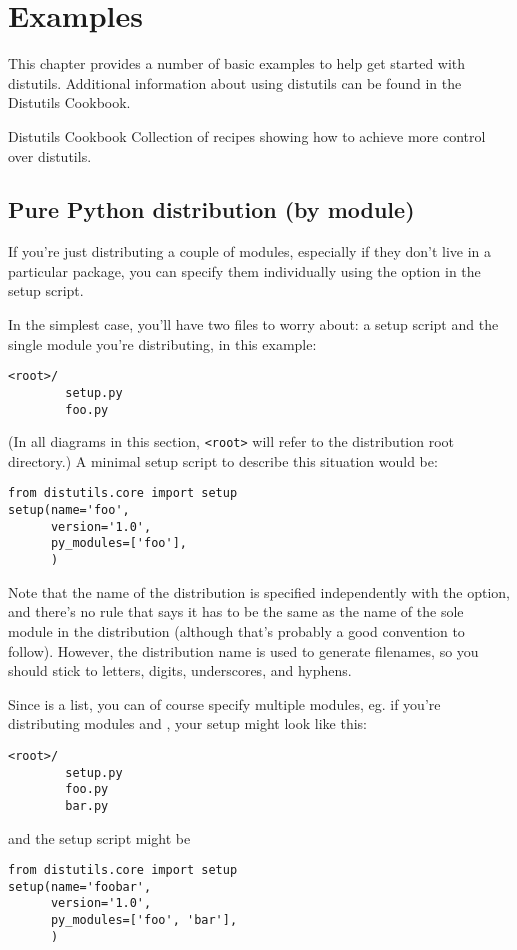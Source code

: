 \documentclass{manual}
\begin{document}
\chapter{Examples}
\label{examples}

This chapter provides a number of basic examples to help get started
with distutils.  Additional information about using distutils can be
found in the Distutils Cookbook.

\begin{seealso}
          {Distutils Cookbook}
          {Collection of recipes showing how to achieve more control
           over distutils.}
\end{seealso}


\section{Pure Python distribution (by module)}
\label{pure-mod}

If you're just distributing a couple of modules, especially if they
don't live in a particular package, you can specify them individually
using the  option in the setup script.

In the simplest case, you'll have two files to worry about: a setup
script and the single module you're distributing,  in this
example:
\begin{verbatim}
<root>/
        setup.py
        foo.py
\end{verbatim}
(In all diagrams in this section, \verb|<root>| will refer to the
distribution root directory.)  A minimal setup script to describe this
situation would be:
\begin{verbatim}
from distutils.core import setup
setup(name='foo',
      version='1.0',
      py_modules=['foo'],
      )
\end{verbatim}
Note that the name of the distribution is specified independently with
the  option, and there's no rule that says it has to be the
same as the name of the sole module in the distribution (although that's
probably a good convention to follow).  However, the distribution name
is used to generate filenames, so you should stick to letters, digits,
underscores, and hyphens.

Since  is a list, you can of course specify multiple 
modules, eg. if you're distributing modules  and
, your setup might look like this:
\begin{verbatim}
<root>/
        setup.py
        foo.py
        bar.py
\end{verbatim}
and the setup script might be
\begin{verbatim}
from distutils.core import setup
setup(name='foobar',
      version='1.0',
      py_modules=['foo', 'bar'],
      )
\end{verbatim}
\end{document}
